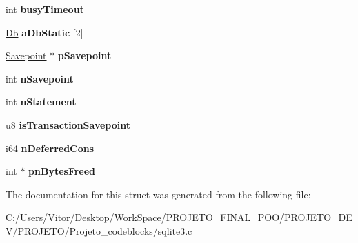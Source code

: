 \begin{DoxyCompactItemize}
\item 
\hypertarget{structsqlite3_a69237f7a2b079706c544f09255fd8905}{int {\bfseries busy\-Timeout}}\label{structsqlite3_a69237f7a2b079706c544f09255fd8905}

\item 
\hypertarget{structsqlite3_ad99069213dff7fede71447b97d22d710}{\hyperlink{struct_db}{Db} {\bfseries a\-Db\-Static} \mbox{[}2\mbox{]}}\label{structsqlite3_ad99069213dff7fede71447b97d22d710}

\item 
\hypertarget{structsqlite3_a47f4fe21bba981ccd47ee7f873f48a07}{\hyperlink{struct_savepoint}{Savepoint} $\ast$ {\bfseries p\-Savepoint}}\label{structsqlite3_a47f4fe21bba981ccd47ee7f873f48a07}

\item 
\hypertarget{structsqlite3_a51d1dc4f5668dbc2282162bdfdca96ec}{int {\bfseries n\-Savepoint}}\label{structsqlite3_a51d1dc4f5668dbc2282162bdfdca96ec}

\item 
\hypertarget{structsqlite3_a727c6da42aa4313c715de350303c90f6}{int {\bfseries n\-Statement}}\label{structsqlite3_a727c6da42aa4313c715de350303c90f6}

\item 
\hypertarget{structsqlite3_acaca2a1d41db7b83a0fe8a477bd22d1d}{u8 {\bfseries is\-Transaction\-Savepoint}}\label{structsqlite3_acaca2a1d41db7b83a0fe8a477bd22d1d}

\item 
\hypertarget{structsqlite3_a1d74627daa6fe93811e99cffe9362c10}{i64 {\bfseries n\-Deferred\-Cons}}\label{structsqlite3_a1d74627daa6fe93811e99cffe9362c10}

\item 
\hypertarget{structsqlite3_a5559fb199b06ee59b635bb18f153fcf8}{int $\ast$ {\bfseries pn\-Bytes\-Freed}}\label{structsqlite3_a5559fb199b06ee59b635bb18f153fcf8}

\end{DoxyCompactItemize}


The documentation for this struct was generated from the following file\-:\begin{DoxyCompactItemize}
\item 
C\-:/\-Users/\-Vitor/\-Desktop/\-Work\-Space/\-P\-R\-O\-J\-E\-T\-O\-\_\-\-F\-I\-N\-A\-L\-\_\-\-P\-O\-O/\-P\-R\-O\-J\-E\-T\-O\-\_\-\-D\-E\-V/\-P\-R\-O\-J\-E\-T\-O/\-Projeto\-\_\-codeblocks/sqlite3.\-c\end{DoxyCompactItemize}
